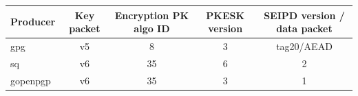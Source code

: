 \begin{tabular}{lcccc}
\toprule
Producer & Key packet & Encryption PK algo ID & PKESK version & SEIPD version / data packet \\
\midrule
gpg & v5 & 8 & 3 & tag20/AEAD \\
sq & v6 & 35 & 6 & 2 \\
gopenpgp & v6 & 35 & 3 & 1 \\
\bottomrule
\end{tabular}
